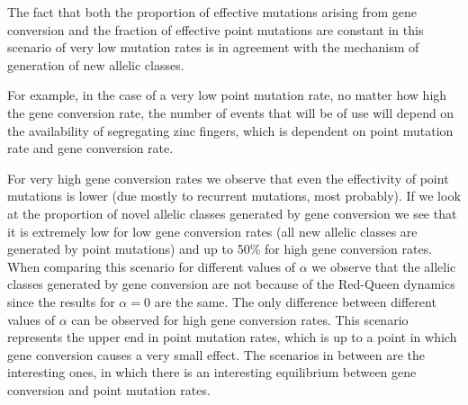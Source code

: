 \documentclass[a4paper,10pt]{article}
\begin{document}
The fact that both the proportion of effective mutations arising from gene conversion and the fraction of effective point mutations are constant in this scenario of very low mutation rates is in agreement with the mechanism of generation of new allelic classes.

For example, in the case of a very low point mutation rate, no matter how high the gene conversion rate, the number of events that will be of use will depend on the availability of segregating zinc fingers, which is dependent on point mutation rate and gene conversion rate. 

For very high gene conversion rates we observe that even the effectivity of point mutations is lower (due mostly to recurrent mutations, most probably). If we look at the proportion of novel allelic classes generated by gene conversion we see that it is extremely low for low gene conversion rates (all new allelic classes are generated by point mutations) and up to 50\% for high gene conversion rates. When comparing this scenario for different values of $\alpha$ we observe that the allelic classes generated by gene conversion are not because of the Red-Queen dynamics since the results for $\alpha=0$ are the same. The only difference between different values of $\alpha$ can be observed for high gene conversion rates. This scenario represents the upper end in point mutation rates, which is up to a point in which gene conversion causes a very small effect. The scenarios in between are the interesting ones, in which there is an interesting equilibrium between gene conversion and point mutation rates. 
\end{document}

